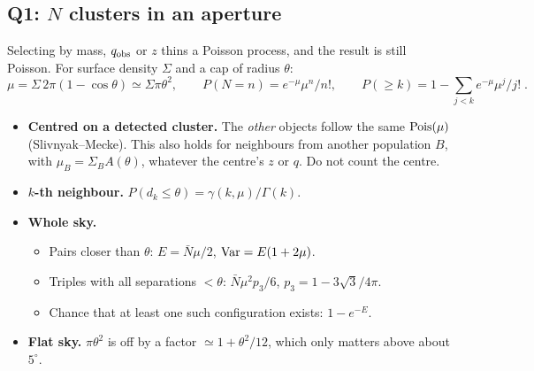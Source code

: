 \documentclass[10pt]{article}
\begin{document}
\subsection{Q1: $N$ clusters in an aperture}
Selecting by mass, $q_{\rm obs}$ or $z$ thins a Poisson process, and the result is still Poisson. For surface density $\Sigma$ and a cap of radius $\theta$:
\begin{equation*}
\mu=\Sigma\,2\pi(1-\cos\theta)\simeq\Sigma\pi\theta^2,\qquad P(N=n)=e^{-\mu}\mu^n/n!,\qquad P(\ge k)=1-\textstyle\sum_{j<k}e^{-\mu}\mu^j/j!\;.
\end{equation*}
\begin{itemize}
\item \textbf{Centred on a detected cluster.} The \emph{other} objects follow the same ${\rm Pois}(\mu)$ (Slivnyak--Mecke). This also holds for neighbours from another population $B$, with $\mu_B=\Sigma_BA(\theta)$, whatever the centre's $z$ or $q$. Do not count the centre.
\item \textbf{$k$-th neighbour.} $P(d_k\le\theta)=\gamma(k,\mu)/\Gamma(k)$.
\item \textbf{Whole sky.}
  \begin{itemize}
  \item Pairs closer than $\theta$: $E=\bar N\mu/2$, ${\rm Var}=E(1+2\mu)$.
  \item Triples with all separations $<\theta$: $\bar N\mu^2p_3/6$, $p_3=1-3\sqrt3/4\pi$.
  \item Chance that at least one such configuration exists: $1-e^{-E}$.
  \end{itemize}
\item \textbf{Flat sky.} $\pi\theta^2$ is off by a factor $\simeq1+\theta^2/12$, which only matters above about $5^\circ$.
\end{itemize}
\end{document}
